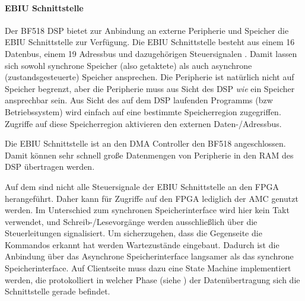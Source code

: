 
\paragraph{EBIU Schnittstelle} \label{ebiuinterface}
Der BF518 DSP bietet zur Anbindung an externe Peripherie und Speicher die \gls{EBIU} Schnittstelle zur Verfügung. Die EBIU Schnittstelle besteht aus einem \SI{16}{\bit} Datenbus, einem \SI{19}{\bit} Adressbus und dazugehörigen Steuersignalen . Damit lassen sich sowohl synchrone Speicher (also getaktete) als auch asynchrone (zustandsgesteuerte) Speicher ansprechen. Die Peripherie ist natürlich nicht auf Speicher begrenzt, aber die Peripherie muss aus Sicht des DSP \emph{wie} ein Speicher ansprechbar sein. Aus Sicht des auf dem DSP laufenden Programms (bzw Betriebssystem) wird einfach auf eine bestimmte Speicherregion zugegriffen. Zugriffe auf diese Speicherregion aktivieren den externen Daten-/Adressbus.



Die EBIU Schnittstelle ist an den \gls{DMA} Controller den BF518 angeschlossen. Damit können sehr schnell große Datenmengen von Peripherie in den RAM des DSP übertragen werden.

Auf dem \comboard sind nicht alle Steuersignale der EBIU Schnittstelle an den FPGA herangeführt. Daher kann für Zugriffe auf den FPGA lediglich der \gls{AMC} genutzt werden. Im Unterschied zum synchronen Speicherinterface wird hier kein Takt verwendet, und Schreib-/Lesevorgänge werden ausschließlich über die Steuerleitungen signalisiert. Um sicherzugehen, dass die Gegenseite die Kommandos erkannt hat werden Wartezustände eingebaut. Dadurch ist die Anbindung über das Asynchrone Speicherinterface langsamer als das synchrone Speicherinterface. Auf Clientseite muss dazu eine State Machine implementiert werden, die protokolliert in welcher Phase (siehe ) der Datenübertragung sich die Schnittstelle gerade befindet.

